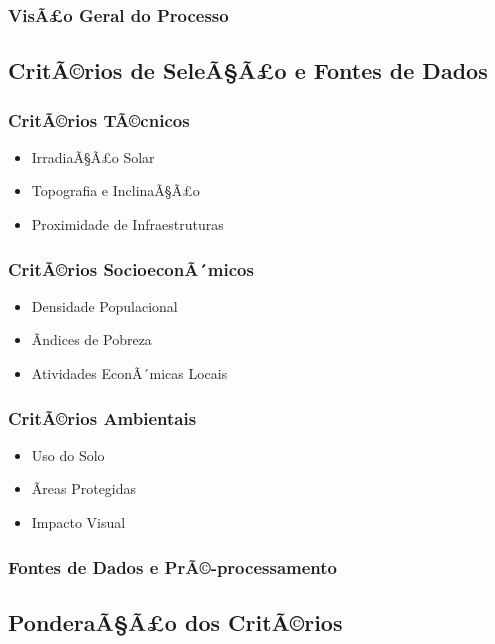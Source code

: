 \documentclass[12pt, a4paper]{article}
\begin{document}
\subsubsection{VisÃ£o Geral do Processo}

\subsection{CritÃ©rios de SeleÃ§Ã£o e Fontes de Dados}
\subsubsection{CritÃ©rios TÃ©cnicos}
\begin{itemize}
    \item IrradiaÃ§Ã£o Solar
    \item Topografia e InclinaÃ§Ã£o
    \item Proximidade de Infraestruturas
\end{itemize}

\subsubsection{CritÃ©rios SocioeconÃ´micos}
\begin{itemize}
    \item Densidade Populacional
    \item Ãndices de Pobreza
    \item Atividades EconÃ´micas Locais
\end{itemize}

\subsubsection{CritÃ©rios Ambientais}
\begin{itemize}
    \item Uso do Solo
    \item Ãreas Protegidas
    \item Impacto Visual
\end{itemize}

\subsubsection{Fontes de Dados e PrÃ©-processamento}

\subsection{PonderaÃ§Ã£o dos CritÃ©rios}
\end{document}
